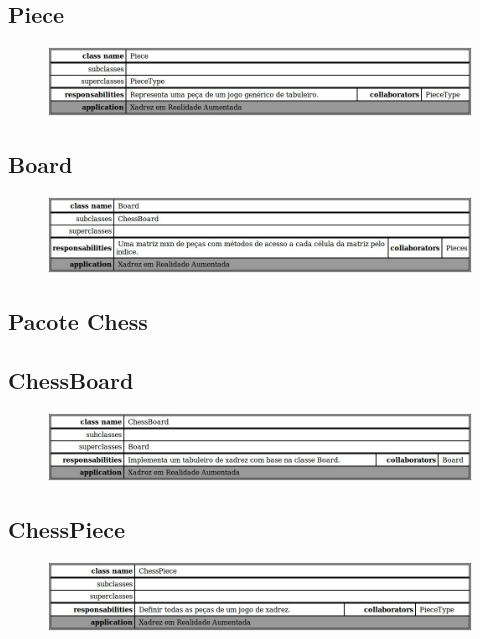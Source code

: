 \documentclass[a4paper,12pt]{book}
\begin{document}
    \subsection{Piece}
    \label{subsec:crcpiece}
    \begin{figure}[H]
	  \centering
	  \includegraphics[width=1.0\textwidth]{crc/Piece}
	  \end{figure}
    \subsection{Board}
    \label{subsec:crcboard}
    \begin{figure}[H]
	  \centering
	  \includegraphics[width=1.0\textwidth]{crc/Board}
	  \end{figure}
    \subsection{Pacote Chess}
    \label{subsec:crcpacotechess}
      \subsection{ChessBoard}
      \label{subsubsec:crcchessboard}
      \begin{figure}[H]
	    \centering
	    \includegraphics[width=1.0\textwidth]{crc/ChessBoard}
	    \end{figure}
      \subsection{ChessPiece}
      \label{subsubsec:crcchesspiece}
      \begin{figure}[H]
	    \centering
	    \includegraphics[width=1.0\textwidth]{crc/ChessPieces}
	    \end{figure}
\end{document}
